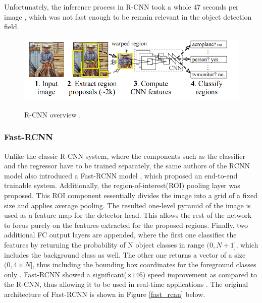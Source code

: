 \documentclass[english, 12pt, a4paper, elec, utf8, a-1b, online]{aaltothesis}
\begin{document}
Unfortunately, the inference process in R-CNN took a whole 47 seconds per image \cite{Girshick2013}, which was not fast enough to be remain relevant in the object detection field. 

\begin{figure}[htb]
	\begin{center}
		\includegraphics[width=12cm]{./rcnn.png}
	\end{center}
	\caption{R-CNN overview \cite{Girshick2013}.}
	\begin{center}
		\label{rcnn}
	\end{center}
\end{figure}


\subsubsection{Fast-RCNN}
Unlike the classic R-CNN system, where the components such as the classifier and the regressor have to be trained separately, the same authors of the RCNN  model also introduced a Fast-RCNN model \cite{Girshick2015}, which proposed an end-to-end trainable system. Additionally, the region-of-interest(ROI) pooling layer was proposed. This ROI component essentially divides the image into a grid of a fixed size and applies average pooling. The resulted one-level pyramid of the image is used as a feature map for the detector head. This allows the rest of the network to focus purely on the features extracted for the proposed regions. Finally, two additional FC output layers are appended, where the first one classifies the features by returning the probability of N object classes in range $(0, N+1]$, which includes the background class as well. The other one returns a vector of a size $(0, 4\times N]$, thus including the bounding box coordinates for the foreground classes only \cite{Girshick2015}. Fast-RCNN showed a significant($\times 146$) speed improvement as compared to the R-CNN, thus allowing it to be used in real-time applications \cite{Girshick2013}. The original architecture of Fast-RCNN is shown in Figure \ref{fast_rcnn} below. 
\end{document}
